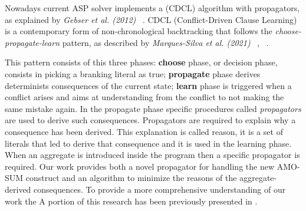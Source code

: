 
Nowadays current ASP solver implements a (CDCL) algorithm with propagators, 
as explained by \textit{Gebser et al. (2012)} ~\cite{DBLP:journals/ai/GebserKS12}.
CDCL (Conflict-Driven Clause Learning) is a contemporary form of non-chronological 
backtracking that follows the \textit{choose-propagate-learn} pattern, 
as described by \textit{Marques-Silva et al. (2021)} ~\cite{DBLP:series/faia/0001LM21}, ~\cite{DIMCAS}.

This pattern consists of this three phases: 
\textbf{choose} phase, or decision phase, consists in picking a branking literal as true; 
\textbf{propagate} phase derives determinists consequences of the current state;
\textbf{learn} phase is triggered when a conflict arises and aims at understanding from the conflict 
to not making the same mistake again.
In the propagate phase  specific procedures called \textit{propagators} are used to derive such consequences.
Propagators are required to explain why a consequence has been derived.
This explanation is called reason, it is a set of literals that led to derive that consequence 
and it is used in the learning phase.
When an aggregate is introduced inside the program then a specific propagator is required.
Our work provides both a novel propagator for handling the new AMO-SUM construct and 
an algorithm to minimize the reasons of the aggregate-derived consequences.
To provide a more comprehensive understanding of our work the 
A portion of this research has been previously presented in \cite{master_thesis}.




